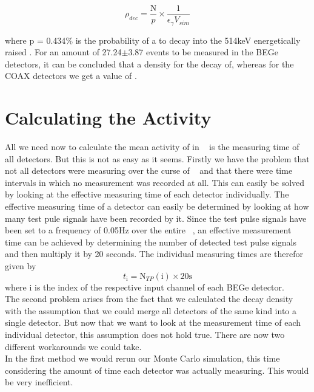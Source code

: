 \documentclass[encoding=utf8,british]{tumphthesis}
\begin{document}
\begin{equation}
\rho_{dec} = \frac{\mathrm{N}}{p}\times\frac{1}{\epsilon_\gamma V_{sim}}
\label{equ:density}
\end{equation}

where p = 0.434$\%$ is the probability of a \Kr to decay into the 514keV energetically raised .
For an amount of 27.24\(\pm\)3.87 events to be measured in the BEGe detectors, it can be concluded that a density for the \Kr decay of, whereas for the COAX detectors we get a value of . 
\\


\section{Calculating the Activity}
\label{sec:CalcActiv}

All we need now to calculate the mean activity of \Kr in \PII~ is the measuring time of all detectors.
But this is not as easy as it seems.
Firstly we have the problem that not all detectors were measuring over the curse of \PII~ and that there were time intervals in which no measurement was recorded at all.
This can easily be solved by looking at the effective measuring time of each detector individually.
The effective measuring time of a detector can easily be determined by looking at how many test pule signals have been recorded by it. 
Since the test pulse signals have been set to a frequency of 0.05Hz over the entire \PII~, an effective measurement time can be achieved by determining the number of detected test pulse signals and then multiply it by 20 seconds.
The individual measuring times are therefor given by
\begin{equation*}
    t_\mathrm{i} = \mathrm{N}_{TP}(\mathrm{i}) \times 20\mathrm{s}
\end{equation*}
where i is the index of the respective input channel of each BEGe detector.
\\

The second problem arises from the fact that we calculated the decay density with the assumption that we could merge all detectors of the same kind into a single detector.
But now that we want to look at the measurement time of each individual detector, this assumption does not hold true.
There are now two different workarounds we could take.
\\

In the first method we would rerun our Monte Carlo simulation, this time considering the amount of time each detector was actually measuring.
This would be very inefficient.
\\
\end{document}
